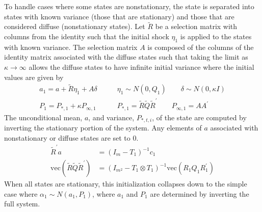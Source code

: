 \documentclass[12pt]{article}
\newcommand{\vecop}[0]{\text{vec}}
\begin{document}
	To handle cases where some states are nonstationary, the state is separated into states with known variance (those that are stationary) and those that are considered diffuse (nonstationary states). Let $\tilde{R}$ be a selection matrix with columns from the identity such that the initial shock $\eta_1$ is applied to the states with known variance. The selection matrix $A$ is composed of the columns of the identity matrix associated with the diffuse states such that taking the limit as $\kappa \rightarrow \infty$ allows the diffuse states to have infinite initial variance where the initial values are given by 
	\begin{align*}
	a_1 = a + \tilde{R} \eta_1 + A \delta \qquad& \eta_1 \sim N(0, Q_1) \qquad \delta \sim N(0, \kappa I) \\
	P_1 = P_{*,1} + \kappa P_{\infty,1} \qquad& P_{*,1} = \tilde{R} \tilde{Q} \tilde{R}^\prime \qquad P_{\infty,1} = A A^\prime 
	\end{align*}
	The unconditional mean, $a$, and variance, $P_{*,t,i}$, of the state are computed by inverting the stationary portion of the system. Any elements of $a$ associated with nonstationary or diffuse states are set to 0.
	\begin{align*}
	\tilde{R}^\prime a &= (I_m - T_1)^{-1} c_1 \\
	\vecop(\tilde{R} \tilde{Q} \tilde{R}^\prime) &= (I_{m^2} - T_1 \otimes T_1)^{-1} \vecop(R_1 Q_1 R_1^\prime) 
	\end{align*}
	When all states are stationary, this initialization collapses down to the simple case where $\alpha_1 \sim N(a_1, P_1)$, where $a_1$ and $P_1$ are determined by inverting the full system. \\
\end{document}
